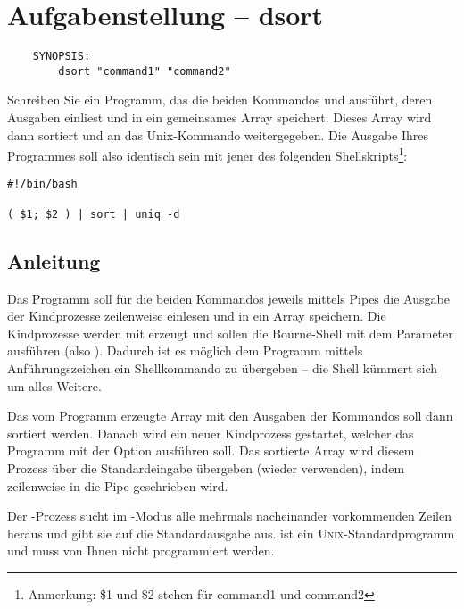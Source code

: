 




\section*{Aufgabenstellung -- dsort}

\begin{verbatim}
    SYNOPSIS:
        dsort "command1" "command2"
\end{verbatim}

Schreiben Sie ein Programm, das die beiden Kommandos 
und  ausführt, deren Ausgaben einliest und in ein
gemeinsames Array speichert. Dieses Array wird dann sortiert und an
das Unix-Kommando  weitergegeben. Die Ausgabe Ihres
Programmes soll also identisch sein mit jener des folgenden
Shellskripts\footnote{Anmerkung: \$1 und \$2 stehen für command1 und
command2}:

\begin{verbatim}
#!/bin/bash

( $1; $2 ) | sort | uniq -d
\end{verbatim}

\subsection*{Anleitung}

Das Programm soll für die beiden Kommandos jeweils mittels Pipes die
Ausgabe der Kindprozesse zeilenweise einlesen und in ein Array
speichern. Die Kindprozesse werden mit  erzeugt und
sollen die Bourne-Shell mit dem Parameter  ausführen (also
). Dadurch ist es möglich dem Programm mittels
Anführungszeichen ein Shellkommando zu übergeben -- die Shell kümmert
sich um alles Weitere.

Das vom Programm erzeugte Array mit den Ausgaben der Kommandos soll
dann sortiert werden. Danach wird ein neuer Kindprozess gestartet,
welcher das Programm  mit der Option  ausführen
soll. Das sortierte Array wird diesem Prozess über die Standardeingabe
übergeben (wieder  verwenden), indem zeilenweise in die
Pipe geschrieben wird.

Der -Prozess sucht im -Modus alle mehrmals
nacheinander vorkommenden Zeilen heraus und gibt sie auf die
Standardausgabe aus.  ist ein
\textsc{Unix}-Standardprogramm und muss von Ihnen nicht programmiert
werden.

